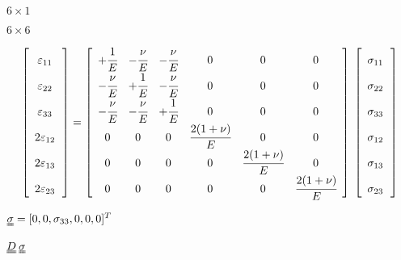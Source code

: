 \documentclass[onecolumn,11pt]{report}
\def\lthtmlcheckvsize{\ifdim\ht\sizebox<\vsize 
  \ifdim\wd\sizebox<\hsize\expandafter\hfill\fi \expandafter\vfill
  \else\expandafter\vss\fi}%
\begin{document}
{\newpage\clearpage
{}%
$ 6 \times 1$%
\lthtmlindisplaymathZ
\lthtmlcheckvsize\clearpage}

{\newpage\clearpage
{}%
$ 6 \times 6$%
\lthtmlindisplaymathZ
\lthtmlcheckvsize\clearpage}

{\newpage\clearpage
{}%
\begin{displaymath}%
	\left[
\begin{array} {c}
\varepsilon_{11} \cfrac{}{}\\
\varepsilon_{22} \cfrac{}{}\\
\varepsilon_{33} \cfrac{}{}\\
2 \varepsilon_{12} \cfrac{}{}\\
2 \varepsilon_{13} \cfrac{}{}\\
2 \varepsilon_{23} \cfrac{}{}
\end{array}
\right] =
\left[
\begin{array}{cccccc}
+\cfrac{1}{E} & -\cfrac{\nu}{E} & -\cfrac{\nu}{E} & 0 & 0 & 0\\
-\cfrac{\nu}{E} & +\cfrac{1}{E} & -\cfrac{\nu}{E} & 0 & 0 & 0\\
-\cfrac{\nu}{E} & -\cfrac{\nu}{E} & +\cfrac{1}{E} & 0 & 0 & 0\\
0 & 0 & 0 & \cfrac{2(1+\nu)}{E} & 0 & 0 \\
0 & 0 & 0 & 0 & \cfrac{2(1+\nu)}{E} & 0 \\
0 & 0 & 0 & 0 & 0 & \cfrac{2(1+\nu)}{E}
\end{array}
\right] \:
\left[
\begin{array} {c}
\sigma_{11} \cfrac{}{}\\
\sigma_{22} \cfrac{}{}\\
\sigma_{33} \cfrac{}{}\\
\sigma_{12} \cfrac{}{}\\
\sigma_{13} \cfrac{}{}\\
\sigma_{23} \cfrac{}{}
\end{array}
\right]\end{displaymath}%
\lthtmldisplayZ
\lthtmlcheckvsize\clearpage}

{\newpage\clearpage
{}%
$ \uuline{\sigma} = [0,0,\sigma_{33},0,0,0]^T$%
\lthtmlindisplaymathZ
\lthtmlcheckvsize\clearpage}

{\newpage\clearpage
{}%
$ \uuline{D} \: \uuline{\sigma}$%
\lthtmlindisplaymathZ
\lthtmlcheckvsize\clearpage}
\end{document}
